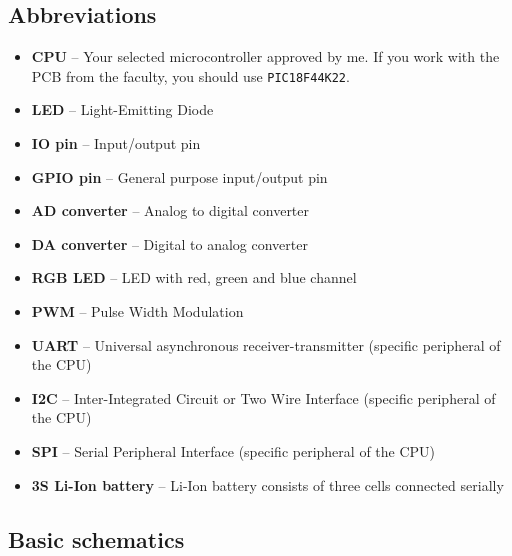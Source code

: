 \documentclass[12pt, a4paper]{article}
\begin{document}
\subsection{Abbreviations}
\begin{itemize}
	\item \textbf{CPU} -- Your selected microcontroller approved by me. If you work with the PCB from the faculty, you should use \texttt{PIC18F44K22}.
	\item \textbf{LED} -- Light-Emitting Diode
	\item \textbf{IO pin} -- Input/output pin
	\item \textbf{GPIO pin} -- General purpose input/output pin
	\item \textbf{AD converter} -- Analog to digital converter
	\item \textbf{DA converter} -- Digital to analog converter
	\item \textbf{RGB LED} -- LED with red, green and blue channel
	\item \textbf{PWM} -- Pulse Width Modulation
	\item \textbf{UART} -- Universal asynchronous receiver-transmitter (specific peripheral of the CPU)
	\item \textbf{I2C} -- Inter-Integrated Circuit or Two Wire Interface (specific peripheral of the CPU)
	\item \textbf{SPI} -- Serial Peripheral Interface (specific peripheral of the CPU)
	\item \textbf{3S Li-Ion battery} -- Li-Ion battery consists of three cells connected serially
\end{itemize}

\subsection{Basic schematics}
\end{document}
